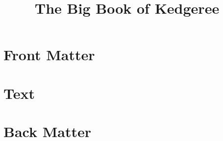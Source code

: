 \documentclass[11pt]{book}
\title{The Big Book of Kedgeree}
\author{}
\begin{document}
\maketitle
\def\title#1{\chapter{#1}}
\tableofcontents

\part{Front Matter}
        
        
\part{Text}
        
        
\part{Back Matter}
        
        


\printbibliography[title={Bibliography}]
\end{document}
